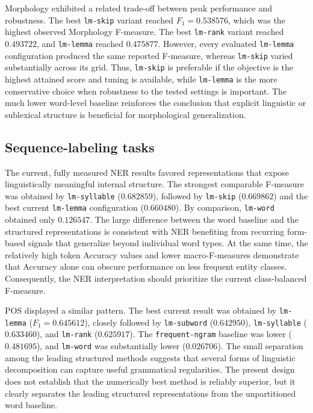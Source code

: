 Morphology exhibited a related trade-off between peak performance and
robustness. The best \texttt{lm-skip} variant reached $F_1=0.538576$, which
was the highest observed Morphology F-measure. The best \texttt{lm-rank}
variant reached $0.493722$, and \texttt{lm-lemma} reached $0.475877$.
However, every evaluated \texttt{lm-lemma} configuration produced the same
reported F-measure, whereas \texttt{lm-skip} varied substantially across its
grid. Thus, \texttt{lm-skip} is preferable if the objective is the highest
attained score and tuning is available, while \texttt{lm-lemma} is the more
conservative choice when robustness to the tested settings is important.
The much lower word-level baseline reinforces the conclusion that explicit
linguistic or sublexical structure is beneficial for morphological
generalization.

\subsection{Sequence-labeling tasks}

The current, fully measured NER results favored representations that expose
linguistically meaningful internal structure. The strongest comparable
F-measure was obtained by \texttt{lm-syllable} ($0.682859$), followed by
\texttt{lm-skip} ($0.669862$) and the best current \texttt{lm-lemma}
configuration ($0.660480$). By comparison, \texttt{lm-word} obtained only
$0.126547$. The large difference between the word baseline and the structured
representations is consistent with NER benefiting from recurring form-based
signals that generalize beyond individual word types. At the same time, the
relatively high token Accuracy values and lower macro-F-measures demonstrate
that Accuracy alone can obscure performance on less frequent entity classes.
Consequently, the NER interpretation should prioritize the current
class-balanced F-measure.

POS displayed a similar pattern. The best current result was obtained by
\texttt{lm-lemma} ($F_1=0.645612$), closely followed by
\texttt{lm-subword} ($0.642950$), \texttt{lm-syllable} ($0.633460$), and
\texttt{lm-rank} ($0.625917$). The \texttt{frequent-ngram} baseline was lower
($0.481695$), and \texttt{lm-word} was substantially lower
($0.026706$). The small separation among the leading structured methods
suggests that several forms of linguistic decomposition can capture useful
grammatical regularities. The present design does not establish that the
numerically best method is reliably superior, but it clearly separates the
leading structured representations from the unpartitioned word baseline.


